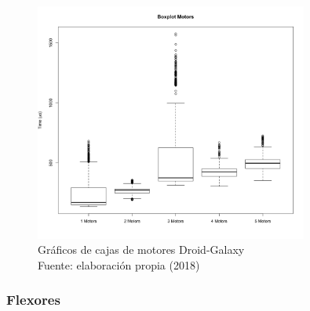 \begin{figure}[H]
  \begin{center} 
   	\includegraphics[width=0.8\textwidth]{evaluation/graphics/Droid/Galaxy/BoxplotMotorsDroidGalaxy.png} 
    \caption[Gráficos de cajas de motores Droid-Galaxy]{Gráficos de cajas de motores Droid-Galaxy\\Fuente: elaboración propia (2018)} 
    \label{fig:droid-galaxy-boxplot-motors}
  \end{center}
\end{figure}



\subsubsection{Flexores}


